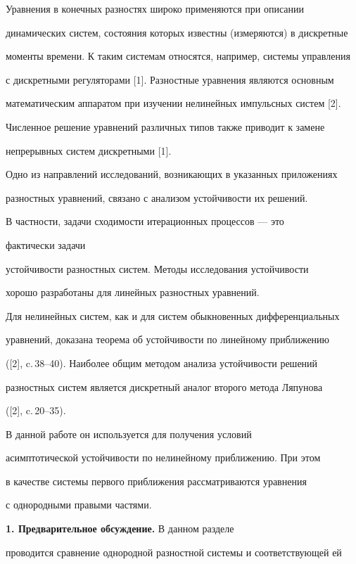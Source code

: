 Уравнения в конечных разностях широко применяются при описании


динамических систем, состояния которых известны (измеряются) в дискретные


моменты времени. К таким системам относятся, например, системы управления


с дискретными регуляторами [1]. Разностные уравнения являются основным


математическим аппаратом при изучении нелинейных импульсных систем [2].


Численное решение уравнений различных типов также приводит к замене


непрерывных систем дискретными [1].





Одно из направлений исследований, возникающих в указанных приложениях


разностных уравнений, связано с анализом устойчивости их решений.


В частности, задачи сходимости итерационных процессов --- это 


фактически задачи


устойчивости разностных систем. Методы исследования устойчивости


хорошо разработаны для линейных разностных уравнений.


Для нелинейных систем, как и для систем обыкновенных дифференциальных


уравнений, доказана теорема об устойчивости по линейному приближению


([2], c.\,38--40). Наиболее общим методом анализа устойчивости решений


разностных систем является дискретный аналог второго метода Ляпунова


([2], c.\,20--35).


В данной работе он используется для получения условий


асимптотической устойчивости по нелинейному приближению. При этом 


в качестве системы первого приближения рассматриваются уравнения 


с однородными правыми частями.


\medskip





{\bf 1. Предварительное обсуждение.} В данном разделе


проводится сравнение однородной разностной системы и соответствующей ей


